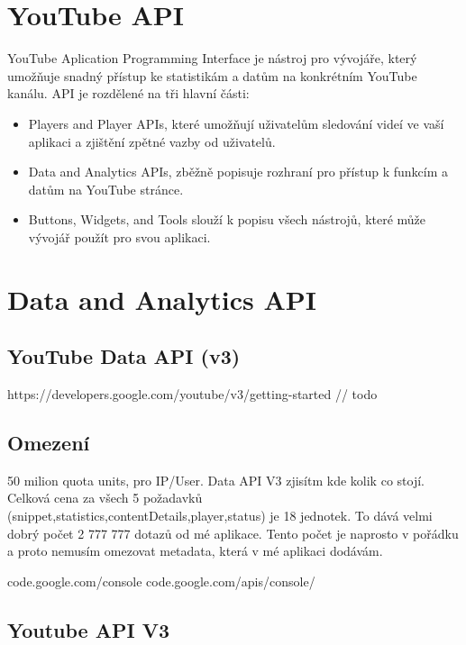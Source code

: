 \section{YouTube API}
\par YouTube Aplication Programming Interface je nástroj pro vývojáře, který umožňuje snadný přístup ke statistikám a datům na konkrétním YouTube kanálu. API je rozdělené na tři hlavní části:
\begin{itemize}
	\item{Players and Player APIs, které umožňují uživatelům sledování videí ve vaší aplikaci a zjištění zpětné vazby od uživatelů.}
	\item{Data and Analytics APIs, zběžně popisuje rozhraní pro přístup k funkcím a datům na YouTube stránce.}
	\item{Buttons, Widgets, and Tools slouží k popisu všech nástrojů, které může vývojář použít pro svou aplikaci.}
\end{itemize}

\section{Data and Analytics API}
\subsection{YouTube Data API (v3)}
https://developers.google.com/youtube/v3/getting-started
// todo

\subsection{Omezení}
50 milion quota units, pro IP/User. 
Data API V3 zjisítm kde kolik co stojí.
Celková cena za všech 5 požadavků (snippet,statistics,contentDetails,player,status) je 18 jednotek. To dává velmi dobrý počet 2 777 777 dotazů od mé aplikace. Tento počet je naprosto v pořádku a proto nemusím omezovat metadata, která v mé aplikaci dodávám. 

code.google.com/console
code.google.com/apis/console/

\subsection{Youtube API V3}
